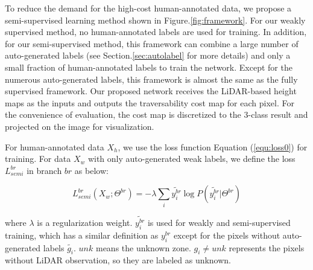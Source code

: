 \documentclass[letterpaper, 10 pt, conference]{ieeeconf}  %
\begin{document}
To reduce the demand for the high-cost human-annotated data, we propose a semi-supervised learning method shown in Figure.\ref{fig:framework}. For our weakly supervised method, no human-annotated labels are used for training. In addition, for our semi-supervised method, this framework can combine a large number of auto-generated labels (see Section.\ref{sec:autolabel} for more details) and only a small fraction of human-annotated labels to train the network. Except for the numerous auto-generated labels, this framework is almost the same as the fully supervised framework. Our proposed network receives the LiDAR-based height maps as the inputs and outputs the traversability cost map for each pixel. For the convenience of evaluation, the cost map is discretized to the 3-class result and projected on the image for visualization.

For human-annotated data $X_h$, we use the loss function Equation (\ref{equ:loss0}) for training. For data $X_w$ with only auto-generated weak labels, we define the loss  $L_{semi}^{br}$ in branch $br$ as below:

\vspace{-4mm}
\begin{equation}
\label{equ:loss1}
L^{br}_{semi}(X_w;\Theta^{br})=-\lambda \sum_{i}{\widetilde{y_i^{br}} \log{P(\widetilde{y_i^{br}}|\Theta^{br})}}
\end{equation}

\vspace{-2mm}
where $\lambda$ is a regularization weight. $\widetilde{y_i^{br}}$ is used for weakly and semi-supervised training, which has a similar definition as $y_i^{br}$ except for the pixels without auto-generated labels $\widetilde{g_i}$. $unk$ means the unknown zone. $g_i\neq unk$ represents the pixels without LiDAR observation, so they are labeled as unknown.
\end{document}
